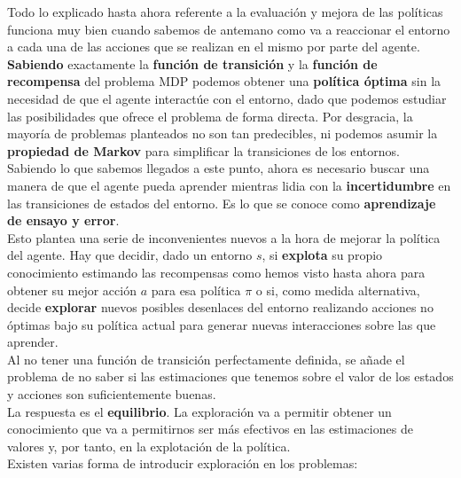 \documentclass[11pt,fleqn]{book} %
\begin{document}
Todo lo explicado hasta ahora referente a la evaluación y mejora de las políticas funciona muy bien cuando sabemos de antemano como va a reaccionar el entorno a cada una de las acciones que se realizan en el mismo por parte del agente. \\

\textbf{Sabiendo} exactamente la \textbf{función de transición} y la \textbf{función de recompensa} del problema MDP podemos obtener una \textbf{política óptima} sin la necesidad de que el agente interactúe con el entorno, dado que podemos estudiar las posibilidades que ofrece el problema de forma directa. Por desgracia, la mayoría de problemas planteados no son tan predecibles, ni podemos asumir la \textbf{propiedad de Markov} para simplificar la transiciones de los entornos. \\

Sabiendo lo que sabemos llegados a este punto, ahora es necesario buscar una manera de que el agente pueda aprender mientras lidia con la \textbf{incertidumbre} en las transiciones de estados del entorno. Es lo que se conoce como \textbf{aprendizaje de ensayo y error}. \\

Esto plantea una serie de inconvenientes nuevos a la hora de mejorar la política del agente. Hay que decidir, dado un entorno $s$, si \textbf{explota} su propio conocimiento estimando las recompensas como hemos visto hasta ahora para obtener su mejor acción $a$ para esa política $\pi$ o si, como medida alternativa, decide \textbf{explorar} nuevos posibles desenlaces del entorno realizando acciones no óptimas bajo su política actual para generar nuevas interacciones sobre las que aprender. \\

Al no tener una función de transición perfectamente definida, se añade el problema de no saber si las estimaciones que tenemos sobre el valor de los estados y acciones son suficientemente buenas. \\

La respuesta es el \textbf{equilibrio}. La exploración va a permitir obtener un conocimiento que va a permitirnos ser más efectivos en las estimaciones de valores y, por tanto, en la explotación de la política. \\

Existen varias forma de introducir exploración en los problemas:
\end{document}
